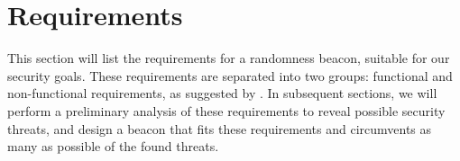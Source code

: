 \section{Requirements}
\label{sec:beacon_requirements}

This section will list the requirements for a randomness beacon, suitable for our security goals.
These requirements are separated into two groups: functional and non-functional requirements, as suggested by \citet[sec.\ 1.4.1]{swebok}.
In subsequent sections, we will perform a preliminary analysis of these requirements to reveal possible security threats, and design a beacon that fits these requirements and circumvents as many as possible of the found threats.



